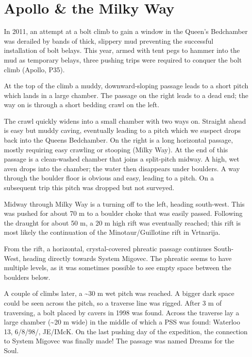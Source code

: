\section{Apollo \& the Milky Way}\label{apollo-the-milky-way}

In 2011, an attempt at a bolt climb to gain a window in the Queen's
Bedchamber was derailed by bands of thick, slippery mud preventing the
successful installation of bolt belays. This year, armed with tent pegs
to hammer into the mud as temporary belays, three pushing trips were
required to conquer the bolt climb (Apollo, P35).

At the top of the climb a muddy, downward-sloping passage leads to a
short pitch which lands in a large chamber. The passage on the right
leads to a dead end; the way on is through a short bedding crawl on the
left.

The crawl quickly widens into a small chamber with two ways on. Straight
ahead is easy but muddy caving, eventually leading to a pitch which we
suspect drops back into the Queens Bedchamber. On the right is a long
horizontal passage, mostly requiring easy crawling or stooping (Milky
Way). At the end of this passage is a clean-washed chamber that joins a
split-pitch midway. A high, wet aven drops into the chamber; the water
then disappears under boulders. A way through the boulder floor is
obvious and easy, leading to a pitch. On a subsequent trip this pitch
was dropped but not surveyed.

Midway through Milky Way is a turning off to the left, heading
south-west. This was pushed for about 70 m to a boulder choke that was
easily passed. Following the draught for about 50 m, a 20 m high rift
was eventually reached; this rift is most likely the continuation of the
Minotaur/Guillotine rift in Vrtnarija.

From the rift, a horizontal, crystal-covered phreatic passage continues
South-West, heading directly towards System Migovec. The phreatic seems
to have multiple levels, as it was sometimes possible to see empty space
between the boulders below.

A couple of climbs later, a \textasciitilde{}30 m wet pitch was reached.
A bigger dark space could be seen across the pitch, so a traverse line
was rigged. After 3 m of traversing, a bolt placed by cavers in 1998 was
found. Across the traverse lay a large chamber (\textasciitilde{}20 m
wide) in the middle of which a PSS was found: Waterloo 13, 6/8/98/,
JE/IMcK. On the last pushing day of the expedition, the connection to
System Migovec was finally made! The passage was named Dreams for the
Soul.

